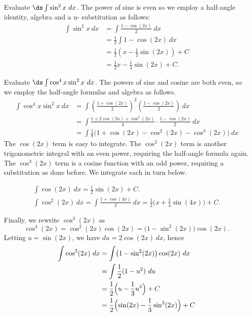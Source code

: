 
\begin{example}\label{ex_sub8}
Evaluate $\ds \int \sin^2x\ dx$.
\solution
The power of sine is even so we employ a half-angle identity, algebra and a u- substitution as follows:
\begin{align*}
	\int \sin^2x\ dx
	&= \int \frac{1-\cos(2x)}2\ dx \\
	&= \frac12\int 1-\cos(2x)\ dx \\
	&= \frac12\left(x - \frac12\sin(2x)\right)+C \\
	&= \frac12x - \frac14\sin(2x) + C.
\end{align*}
\end{example}

\begin{example}\label{ex_trigint3}
Evaluate $\ds\int\cos^4x\sin^2x\ dx$.
\solution
The powers of sine and cosine are both even, so we employ the half-angle formulas and algebra as follows.
\begin{align*}
	\int \cos^4x\sin^2x\ dx
	&= \int\left(\frac{1+\cos(2x)}{2}\right)^2\left(\frac{1-\cos(2x)}2\right)\ dx \\
	&= \int\frac{1+2\cos(2x)+\cos^2(2x)}4\cdot\frac{1-\cos(2x)}2\ dx\\
	&=	\int \frac18\bigl(1+\cos(2x)-\cos^2(2x)-\cos^3(2x)\bigr)\ dx
\end{align*}
The $\cos(2x)$ term is easy to integrate.
The $\cos^2(2x)$ term is another trigonometric integral with an even power, requiring the half-angle formula again. The $\cos^3(2x)$ term is a cosine function with an odd power, requiring a substitution as done before. We integrate each in turn below.

\begin{gather*}
\int\cos(2x)\ dx = \frac12\sin(2x)+C.\\
\int\cos^2(2x)\ dx = \int \frac{1+\cos(4x)}2\ dx
= \frac12\bigl(x+\frac14\sin(4x)\bigr)+C.
\end{gather*}

Finally, we rewrite $\cos^3(2x)$ as
\[\cos^3(2x) = \cos^2(2x)\cos(2x) = \bigl(1-\sin^2(2x)\bigr)\cos(2x).\]
Letting $u=\sin(2x)$, we have $du = 2\cos(2x)\ dx$, hence
\begin{align*}
\int \cos^3(2x)\ dx &= \int\bigl(1-\sin^2(2x)\bigr)\cos(2x)\ dx\\
							&= \int \frac12(1-u^2)\ du\\
							&= \frac12\Bigl(u-\frac13u^3\Bigr)+C\\
							&=	\frac12\Bigl(\sin(2x)-\frac13\sin^3(2x)\Bigr)+C
\end{align*}


\end{example}
